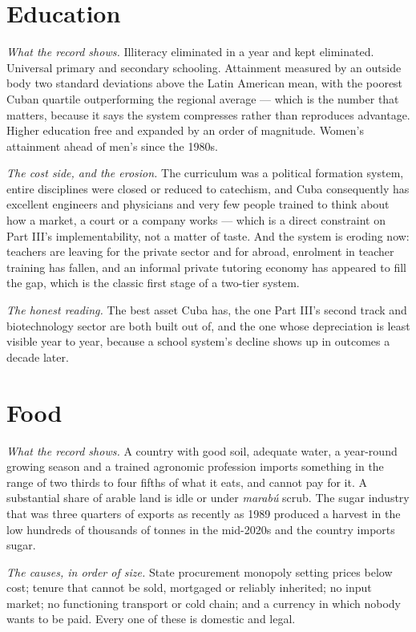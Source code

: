 \section{Education}

\emph{What the record shows.} Illiteracy eliminated in a year and kept
eliminated. Universal primary and secondary schooling. Attainment measured by
an outside body two standard deviations above the Latin American mean, with the
poorest Cuban quartile outperforming the regional average --- which is the
number that matters, because it says the system compresses rather than
reproduces advantage. Higher education free and expanded by an order of
magnitude. Women's attainment ahead of men's since the 1980s.

\emph{The cost side, and the erosion.} The curriculum was a political
formation system, entire disciplines were closed or reduced to catechism, and
Cuba consequently has excellent engineers and physicians and very few people
trained to think about how a market, a court or a company works --- which is a
direct constraint on Part III's implementability, not a matter of taste. And the
system is eroding now: teachers are leaving for the private sector and for
abroad, enrolment in teacher training has fallen, and an informal private
tutoring economy has appeared to fill the gap, which is the classic first stage
of a two-tier system.

\emph{The honest reading.} The best asset Cuba has, the one Part III's second
track and biotechnology sector are both built out of, and the one whose
depreciation is least visible year to year, because a school system's decline
shows up in outcomes a decade later.

\section{Food}

\emph{What the record shows.} A country with good soil, adequate water, a
year-round growing season and a trained agronomic profession imports something
in the range of two thirds to four fifths of what it eats, and cannot pay for
it.\unv{} A substantial share of arable land is idle or under \emph{marab\'u}
scrub. The sugar industry that was three quarters of exports as recently as 1989
produced a harvest in the low hundreds of thousands of tonnes in the mid-2020s
and the country imports sugar.

\emph{The causes, in order of size.} State procurement monopoly setting prices
below cost; tenure that cannot be sold, mortgaged or reliably inherited; no
input market; no functioning transport or cold chain; and a currency in which
nobody wants to be paid. Every one of these is domestic and legal.

